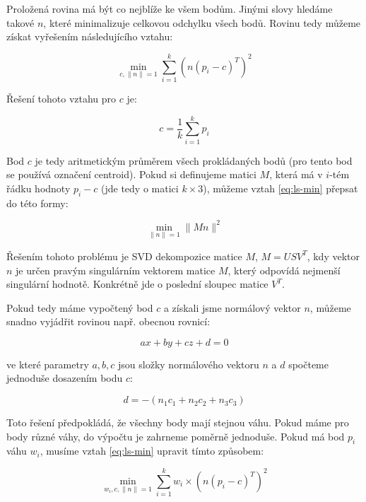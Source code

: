 \documentclass[11pt,twoside,a4paper]{book}
\begin{document}
Proložená rovina má být co nejblíže ke všem bodům. Jinými slovy hledáme takové $n$, které minimalizuje celkovou odchylku všech bodů. Rovinu tedy můžeme získat vyřešením následujícího vztahu:

\begin{equation}
\label{eq:ls-min}
\min_{c,\|n\|=1} \sum\limits_{i=1}^k (n (p_i - c)^T)^2
\end{equation}

Řešení tohoto vztahu pro $c$ je:

\begin{equation}
c = \frac{1}{k} \sum\limits_{i=1}^k p_i
\end{equation}

Bod $c$ je tedy aritmetickým průměrem všech prokládaných bodů (pro tento bod se používá označení centroid). Pokud si definujeme matici $M$, která má v $i$-tém řádku hodnoty $p_i - c$ (jde tedy o matici $k \times 3$), můžeme vztah  \ref{eq:ls-min} přepsat do této formy:

\begin{equation}
\min_{\|n\|=1} \|M n\|^2
\end{equation}

Řešením tohoto problému je SVD dekompozice matice $M$, $M = USV^T$, kdy vektor $n$ je určen pravým singulárním vektorem matice $M$, který odpovídá nejmenší singulární hodnotě. Konkrétně jde o poslední sloupec matice $V^T$.

Pokud tedy máme vypočtený bod $c$ a získali jsme normálový vektor $n$, můžeme snadno vyjádřit rovinou např. obecnou rovnicí:

\begin{equation}
ax + by + cz + d = 0
\end{equation}

\noindent
ve které parametry $a, b, c$ jsou složky normálového vektoru $n$ a $d$ spočteme jednoduše dosazením bodu $c$:

\begin{equation}
\label{eq:d}
d = -(n_1c_1 + n_2c_2 + n_3c_3)
\end{equation}

Toto řešení předpokládá, že všechny body mají stejnou váhu. Pokud máme pro body různé váhy, do výpočtu je zahrneme poměrně jednoduše. Pokud má bod $p_i$ váhu $w_i$, musíme vztah \ref{eq:ls-min} upravit tímto způsobem:

\begin{equation}
\min_{w_i,c,\|n\|=1} \sum\limits_{i=1}^k w_i \times (n (p_i - c)^T)^2
\end{equation}
\end{document}
